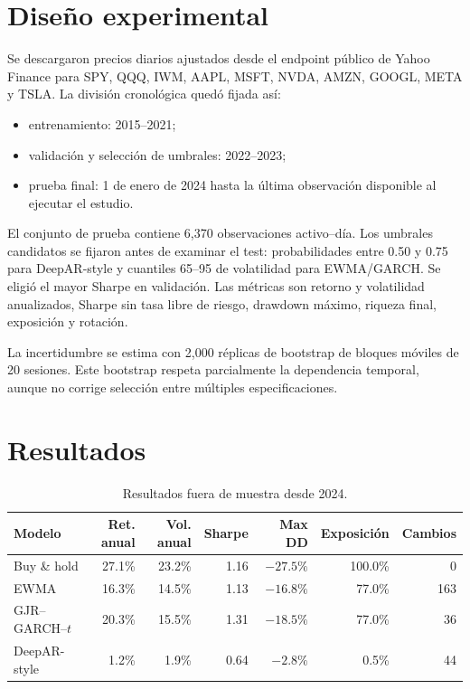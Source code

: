 \documentclass[11pt]{article}
\begin{document}
\section{Diseño experimental}
Se descargaron precios diarios ajustados desde el endpoint público de Yahoo Finance para SPY, QQQ, IWM,
AAPL, MSFT, NVDA, AMZN, GOOGL, META y TSLA. La división cronológica quedó fijada así:
\begin{itemize}
  \item entrenamiento: 2015--2021;
  \item validación y selección de umbrales: 2022--2023;
  \item prueba final: 1 de enero de 2024 hasta la última observación disponible al ejecutar el estudio.
\end{itemize}
El conjunto de prueba contiene 6,370 observaciones activo--día. Los umbrales candidatos se fijaron antes de
examinar el test: probabilidades entre 0.50 y 0.75 para DeepAR-style y cuantiles 65--95 de volatilidad para
EWMA/GARCH. Se eligió el mayor Sharpe en validación. Las métricas son retorno y volatilidad anualizados,
Sharpe sin tasa libre de riesgo, drawdown máximo, riqueza final, exposición y rotación.

La incertidumbre se estima con 2,000 réplicas de bootstrap de bloques móviles de 20 sesiones. Este bootstrap
respeta parcialmente la dependencia temporal, aunque no corrige selección entre múltiples especificaciones.

\section{Resultados}
\begin{table}[ht]
\centering
\caption{Resultados fuera de muestra desde 2024.}
\begin{tabular}{lrrrrrr}
\toprule
Modelo & Ret. anual & Vol. anual & Sharpe & Max DD & Exposición & Cambios \\
\midrule
Buy \& hold   & 27.1\% & 23.2\% & 1.16 & $-27.5\%$ & 100.0\% & 0 \\
EWMA          & 16.3\% & 14.5\% & 1.13 & $-16.8\%$ & 77.0\% & 163 \\
GJR--GARCH--$t$ & 20.3\% & 15.5\% & 1.31 & $-18.5\%$ & 77.0\% & 36 \\
DeepAR-style  & 1.2\%  & 1.9\%  & 0.64 & $-2.8\%$  & 0.5\%  & 44 \\
\bottomrule
\end{tabular}
\end{table}
\end{document}
